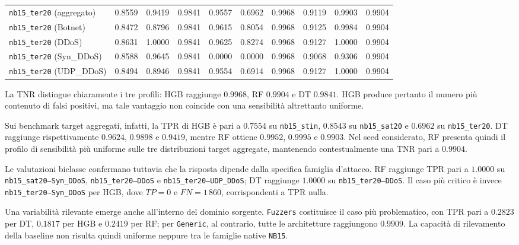 \begin{table}[H]
{\begin{tabular}{lccc|ccc|ccc}
        \texttt{nb15\_ter20} (aggregato) & 0.8559 & 0.9419 & 0.9841 & 0.9557 & 0.6962 & 0.9968 & 0.9119 & 0.9903 & 0.9904 \\
        \texttt{nb15\_ter20} (Botnet) & 0.8472 & 0.8796 & 0.9841 & 0.9615 & 0.8054 & 0.9968 & 0.9125 & 0.9984 & 0.9904 \\
        \texttt{nb15\_ter20} (DDoS) & 0.8631 & 1.0000 & 0.9841 & 0.9625 & 0.8274 & 0.9968 & 0.9127 & 1.0000 & 0.9904 \\
        \texttt{nb15\_ter20} (Syn\_DDoS) & 0.8588 & 0.9645 & 0.9841 & 0.0000 & 0.0000 & 0.9968 & 0.9068 & 0.9306 & 0.9904 \\
        \texttt{nb15\_ter20} (UDP\_DDoS) & 0.8494 & 0.8946 & 0.9841 & 0.9554 & 0.6914 & 0.9968 & 0.9127 & 1.0000 & 0.9904 \\
        \bottomrule
    \end{tabular}
    }
\end{table}

La TNR distingue chiaramente i tre profili: HGB raggiunge $0.9968$, RF $0.9904$ e DT $0.9841$. 
HGB produce pertanto il numero più contenuto di falsi positivi, ma tale vantaggio non coincide con una sensibilità altrettanto uniforme.

Sui benchmark target aggregati, infatti, la TPR di HGB è pari a $0.7554$ su \texttt{nb15\_stin}, $0.8543$ su \texttt{nb15\_sat20} e $0.6962$ su \texttt{nb15\_ter20}. 
DT raggiunge rispettivamente $0.9624$, $0.9898$ e $0.9419$, mentre RF ottiene $0.9952$, $0.9995$ e $0.9903$. 
Nel seed considerato, RF presenta quindi il profilo di sensibilità più uniforme sulle tre distribuzioni target aggregate, mantenendo contestualmente una TNR pari a $0.9904$.

Le valutazioni biclasse confermano tuttavia che la risposta dipende dalla specifica famiglia d'attacco. 
RF raggiunge TPR pari a $1.0000$ su \texttt{nb15\_sat20--Syn\_DDoS},
\texttt{nb15\_ter20--DDoS} e \texttt{nb15\_ter20--UDP\_DDoS}; DT raggiunge $1.0000$ su \texttt{nb15\_ter20--DDoS}. 
Il caso più critico è invece \texttt{nb15\_ter20--Syn\_DDoS} per HGB, dove $TP=0$ e $FN=1\,860$, corrispondenti a TPR nulla.

Una variabilità rilevante emerge anche all'interno del dominio sorgente.
\texttt{Fuzzers} costituisce il caso più problematico, con TPR pari a $0.2823$ per DT, $0.1817$ per HGB e $0.2419$ per RF; per \texttt{Generic}, al contrario, tutte le architetture raggiungono $0.9909$.
La capacità di rilevamento della baseline non risulta quindi uniforme neppure tra le famiglie native \texttt{NB15}.

